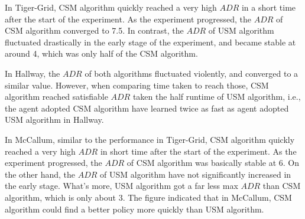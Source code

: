 \documentclass{article}
\begin{document}


In Tiger-Grid, CSM algorithm quickly reached a very high $ADR$ in a short
time after the start of the experiment. As the experiment progressed, the $ADR$ of
CSM algorithm converged to 7.5. In contrast, the $ADR$ of USM algorithm fluctuated
drastically in the early stage of the experiment, and became stable at around 4, which
was only half of the CSM algorithm.

In Hallway, the $ADR$ of both algorithms fluctuated violently,  
and converged to a similar value. However, when comparing time taken to reach those,
CSM algorithm reached satisfiable $ADR$ taken the half runtime of USM algorithm, i.e.,
the agent adopted CSM algorithm have learned twice as fast as agent adopted USM algorithm
in Hallway.

In McCallum, similar to the performance in Tiger-Grid, CSM algorithm quickly reached
a very high $ADR$ in short time after the start of the experiment. As the experiment
progressed, the $ADR$ of CSM algorithm was basically stable at 6. On the other hand,
the $ADR$ of USM algorithm have not significantly increased in the early stage. What's more,
USM algorithm got a far less max $ADR$ than CSM algorithm, which is only about 3. The figure
indicated that in McCallum, CSM algorithm could find a better policy more quickly than USM
algorithm.
\end{document}
